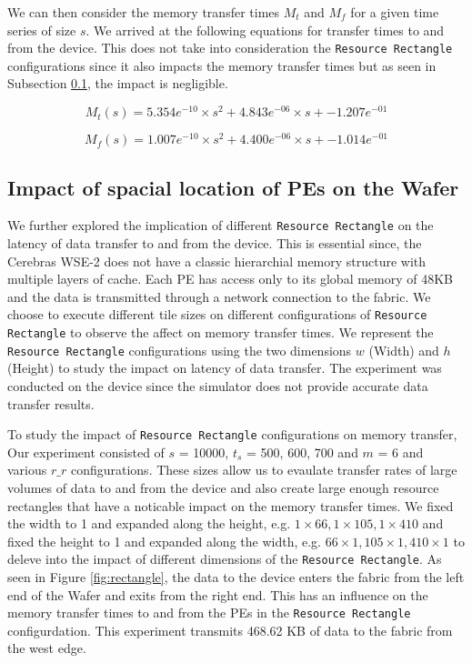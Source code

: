 We can then consider the memory transfer times $M_{t}$ and $M_{f}$ for a given time series of size $s$. We arrived at the following equations for transfer times to and from the device. This does not take into consideration the \texttt{Resource Rectangle} configurations since it also impacts the memory transfer times but as seen in Subsection \ref{subsection:wafer_location}, the impact is negligible.

\begin{equation}
    M_{t}(s) = 5.354e^{-10} \times s^2 + 4.843e^{-06} \times s + -1.207e^{-01}
    \label{eq:memory_to_device}
\end{equation}

\begin{equation}
    M_{f}(s) = 1.007e^{-10} \times s^2 + 4.400e^{-06} \times s + -1.014e^{-01}
    \label{eq:memory_from_device}
\end{equation}

\subsection{Impact of spacial location of PEs on the Wafer} \label{subsection:wafer_location}

We further explored the implication of different \texttt{Resource Rectangle} on the latency of data transfer to and from the device. This is essential since, the Cerebras WSE-2 does not have a classic hierarchial memory structure with multiple layers of cache. Each PE has access only to its global memory of 48KB and the data is transmitted through a network connection to the fabric. We choose to execute different tile sizes on different configurations of \texttt{Resource Rectangle} to observe the affect on memory transfer times. We represent the \texttt{Resource Rectangle} configurations using the two dimensions $w$ (Width) and $h$ (Height) to study the impact on latency of data transfer. The experiment was conducted on the device since the simulator does not provide accurate data transfer results. 

To study the impact of \texttt{Resource Rectangle} configurations on memory transfer, Our experiment consisted of $s$ = 10000, $t_s$ = 500, 600, 700 and $m$ = 6 and various $r\_r$ configurations. These sizes allow us to evaulate transfer rates of large volumes of data to and from the device and also create large enough resource rectangles that have a noticable impact on the memory transfer times. We fixed the width to 1 and expanded along the height, e.g. $1\times66, 1\times105, 1\times410$ and fixed the height to 1 and expanded along the width, e.g. $66\times1, 105\times1, 410\times1$ to deleve into the impact of different dimensions of the \texttt{Resource Rectangle}. As seen in Figure \ref{fig:rectangle}, the data to the device enters the fabric from the left end of the Wafer and exits from the right end. This has an influence on the memory transfer times to and from the PEs in the \texttt{Resource Rectangle} configurdation. This experiment transmits 468.62 KB of data to the fabric from the west edge.

